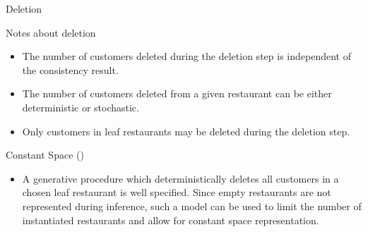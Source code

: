 \documentclass{beamer}
\begin{document}
\begin{frame}[t]{Deletion}
	\begin{block}{Notes about deletion}
		\begin{itemize}
			\item The number of customers deleted during the deletion step is independent of the consistency result.
			\item The number of customers deleted from a given restaurant can be either deterministic or stochastic.
			\item Only customers in leaf restaurants may be deleted during the deletion step.
		\end{itemize}
	\end{block}
	
	\begin{block}{Constant Space (\citet{Bartlett2010})}
		\begin{itemize}
			\item A generative procedure which deterministically deletes all customers in a chosen leaf restaurant is well specified.  Since empty restaurants are not represented during inference, such a model can be used to limit the number of instantiated restaurants and allow for constant space representation.
			\end{itemize}
	\end{block}
\end{frame}

\end{document}
